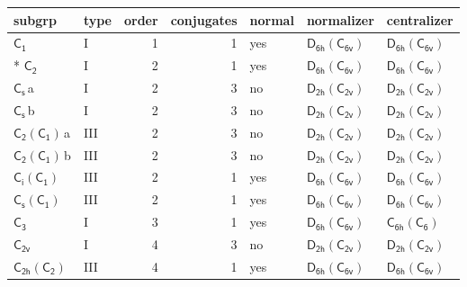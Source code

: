 \documentclass[10pt,a4paper]{article}
\numberwithin{equation}{section}
\newcommand{\grp}[1]{\mathsf{#1}}
\newcommand{\clsletter}[1]{\,{\scriptsize\color{black!55}#1}}
\begin{document}
{\small\begin{longtable}{@{}llrrlll@{}}\toprule
subgrp & type & order & conjugates & normal & normalizer & centralizer\\\midrule\endhead
\bottomrule\endfoot\endlastfoot
\href{../../../rotation/data/pdf/C1.pdf}{$\grp{C_{1}}$} & I & 1 & 1 & yes & \href{D6h-C6v.pdf}{$\grp{D_{6h}}(\grp{C_{6v}})$} & \href{D6h-C6v.pdf}{$\grp{D_{6h}}(\grp{C_{6v}})$}\\*
\href{../../../rotation/data/pdf/C2.pdf}{$\grp{C_{2}}$} & I & 2 & 1 & yes & \href{D6h-C6v.pdf}{$\grp{D_{6h}}(\grp{C_{6v}})$} & \href{D6h-C6v.pdf}{$\grp{D_{6h}}(\grp{C_{6v}})$}\\
\href{../../../rotation/data/pdf/C1v.pdf}{$\grp{C_{s}}$}\clsletter{a} & I & 2 & 3 & no & \href{D2h-C2v.pdf}{$\grp{D_{2h}}(\grp{C_{2v}})$} & \href{D2h-C2v.pdf}{$\grp{D_{2h}}(\grp{C_{2v}})$}\\
\href{../../../rotation/data/pdf/C1v.pdf}{$\grp{C_{s}}$}\clsletter{b} & I & 2 & 3 & no & \href{D2h-C2v.pdf}{$\grp{D_{2h}}(\grp{C_{2v}})$} & \href{D2h-C2v.pdf}{$\grp{D_{2h}}(\grp{C_{2v}})$}\\
\href{C2-C1.pdf}{$\grp{C_{2}}(\grp{C_{1}})$}\clsletter{a} & III & 2 & 3 & no & \href{D2h-C2v.pdf}{$\grp{D_{2h}}(\grp{C_{2v}})$} & \href{D2h-C2v.pdf}{$\grp{D_{2h}}(\grp{C_{2v}})$}\\
\href{C2-C1.pdf}{$\grp{C_{2}}(\grp{C_{1}})$}\clsletter{b} & III & 2 & 3 & no & \href{D2h-C2v.pdf}{$\grp{D_{2h}}(\grp{C_{2v}})$} & \href{D2h-C2v.pdf}{$\grp{D_{2h}}(\grp{C_{2v}})$}\\
\href{S2-C1.pdf}{$\grp{C_{i}}(\grp{C_{1}})$} & III & 2 & 1 & yes & \href{D6h-C6v.pdf}{$\grp{D_{6h}}(\grp{C_{6v}})$} & \href{D6h-C6v.pdf}{$\grp{D_{6h}}(\grp{C_{6v}})$}\\
\href{C1v-C1.pdf}{$\grp{C_{s}}(\grp{C_{1}})$} & III & 2 & 1 & yes & \href{D6h-C6v.pdf}{$\grp{D_{6h}}(\grp{C_{6v}})$} & \href{D6h-C6v.pdf}{$\grp{D_{6h}}(\grp{C_{6v}})$}\\
\href{../../../rotation/data/pdf/C3.pdf}{$\grp{C_{3}}$} & I & 3 & 1 & yes & \href{D6h-C6v.pdf}{$\grp{D_{6h}}(\grp{C_{6v}})$} & \href{C6h-C6.pdf}{$\grp{C_{6h}}(\grp{C_{6}})$}\\
\href{../../../rotation/data/pdf/C2v.pdf}{$\grp{C_{2v}}$} & I & 4 & 3 & no & \href{D2h-C2v.pdf}{$\grp{D_{2h}}(\grp{C_{2v}})$} & \href{D2h-C2v.pdf}{$\grp{D_{2h}}(\grp{C_{2v}})$}\\
\href{C2h-C2.pdf}{$\grp{C_{2h}}(\grp{C_{2}})$} & III & 4 & 1 & yes & \href{D6h-C6v.pdf}{$\grp{D_{6h}}(\grp{C_{6v}})$} & \href{D6h-C6v.pdf}{$\grp{D_{6h}}(\grp{C_{6v}})$}\\

\end{longtable}}
\end{document}
